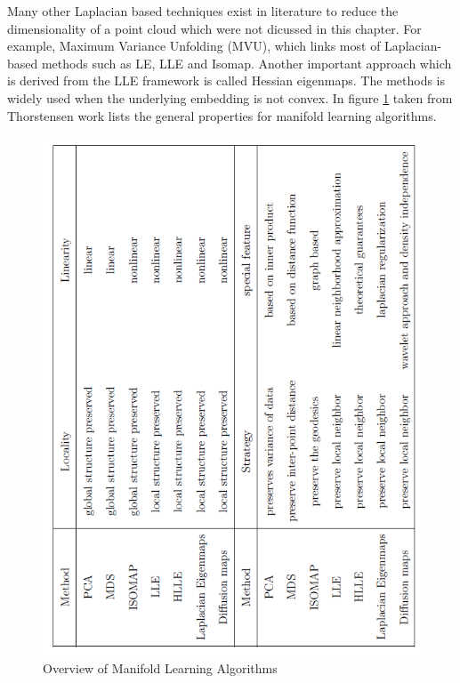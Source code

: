 Many other Laplacian based techniques exist in literature to reduce the dimensionality of a point cloud which were not dicussed in this chapter. For example, Maximum Variance Unfolding (MVU)\citep{Ety2008}, which links most of Laplacian-based methods such as LE, LLE and Isomap. Another important approach which is derived from the LLE framework is called Hessian eigenmaps\citep{Ety2008}. The methods is widely used when the underlying embedding is not convex. In figure \ref{comp} taken from Thorstensen work \citep{Thor2009} lists the general properties for manifold learning algorithms.
\begin{figure}[ht]
\begin{center}
\includegraphics[width=\textwidth]{./Figures/comp_table.png}
\caption {Overview of Manifold Learning Algorithms}
\label{comp} 
\end{center}
\end{figure}
